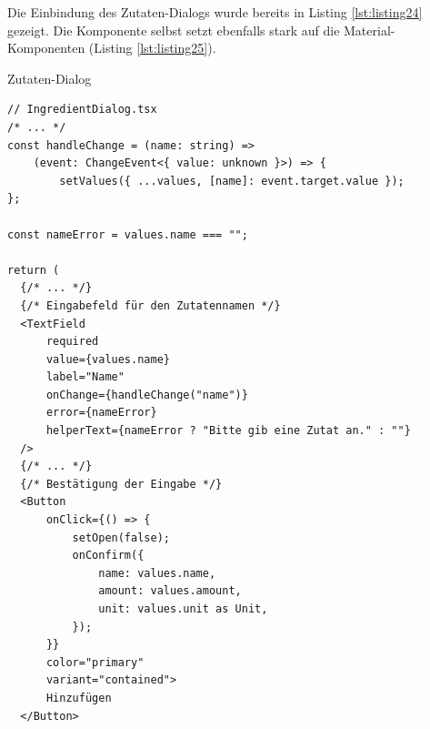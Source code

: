 Die Einbindung des Zutaten-Dialogs wurde bereits in Listing \ref{lst:listing24} gezeigt. Die Komponente selbst setzt ebenfalls stark auf die Material-Komponenten (Listing \ref{lst:listing25}).

\begin{listing}
\caption{Zutaten-Dialog}
\label{lst:listing25}
\begin{verbatim}
// IngredientDialog.tsx
/* ... */
const handleChange = (name: string) =>
    (event: ChangeEvent<{ value: unknown }>) => {
        setValues({ ...values, [name]: event.target.value });
};

const nameError = values.name === "";

return (
  {/* ... */}
  {/* Eingabefeld für den Zutatennamen */}
  <TextField
      required
      value={values.name}
      label="Name"
      onChange={handleChange("name")}
      error={nameError}
      helperText={nameError ? "Bitte gib eine Zutat an." : ""}
  />
  {/* ... */}
  {/* Bestätigung der Eingabe */}
  <Button
      onClick={() => {
          setOpen(false);
          onConfirm({
              name: values.name,
              amount: values.amount,
              unit: values.unit as Unit,
          });
      }}
      color="primary"
      variant="contained">
      Hinzufügen
  </Button>
\end{verbatim}
\end{listing}